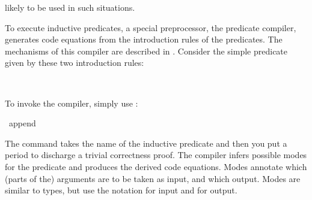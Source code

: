 \begin{isabellebody}
\begin{isamarkuptext}
  likely to be used in such situations.%
\end{isamarkuptext}%
\isamarkuptrue%
%
\isamarkuptrue%
%
\begin{isamarkuptext}%
To execute inductive predicates, a special preprocessor, the predicate
 compiler, generates code equations from the introduction rules of the predicates.
The mechanisms of this compiler are described in \cite{Berghofer-Bulwahn-Haftmann:2009:TPHOL}.
Consider the simple predicate  given by these two
introduction rules:%
\end{isamarkuptext}%
\isamarkuptrue%
%
\isadelimquote
%
\endisadelimquote
%
\isatagquote
%
\begin{isamarkuptext}%
\\
\noindent{}%
\end{isamarkuptext}%
\isamarkuptrue%
%
\endisatagquote
{\isafoldquote}%
%
\isadelimquote
%
\endisadelimquote
%
\begin{isamarkuptext}%
\noindent To invoke the compiler, simply use \hypertarget{command.code-pred}{\hyperlink{command.code-pred}{\mbox{}}}:%
\end{isamarkuptext}%
\isamarkuptrue%
%
\isadelimquote
%
\endisadelimquote
%
\isatagquote
{}\isamarkupfalse%
\ append\ \isacommand{{\isachardot}}\isamarkupfalse%
%
\endisatagquote
{\isafoldquote}%
%
\isadelimquote
%
\endisadelimquote
%
\begin{isamarkuptext}%
\noindent The \hyperlink{command.code-pred}{\mbox{}} command takes the name
of the inductive predicate and then you put a period to discharge
a trivial correctness proof. 
The compiler infers possible modes 
for the predicate and produces the derived code equations.
Modes annotate which (parts of the) arguments are to be taken as input,
and which output. Modes are similar to types, but use the notation 
for input and  for output.
 

\end{isamarkuptext}
\end{isabellebody}
